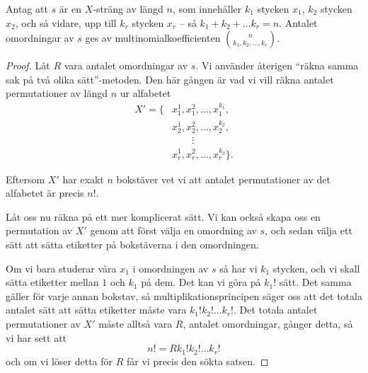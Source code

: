 \documentclass[nobib]{tufte-handout}
\begin{document}
\begin{proposition}
  Antag att $s$ är en $X$-sträng av längd $n$, som innehåller $k_1$ stycken $x_1$, $k_2$ stycken $x_2$, och så vidare, upp till $k_r$ stycken $x_r$ -- så $k_1 + k_2 + \ldots k_r = n$. Antalet omordningar av $s$ ges av multinomialkoefficienten $\binom{n}{k_1, k_2, \ldots, k_r}$.

  \begin{proof}
    Låt $R$ vara antalet omordningar av $s$. Vi använder återigen ``räkna samma sak på två olika sätt''-metoden. Den här gången är vad vi vill räkna antalet permutationer av längd $n$ ur alfabetet
    \begin{align*}
      X' = \{&x_1^1, x_1^2, \ldots, x_1^{k_1},\\
             &x_2^1, x_2^2, \ldots, x_2^{k_2},\\
             &\qquad\vdots\\
             &x_r^1, x_r^2, \ldots, x_r^{k_3}\}.
    \end{align*}

    Eftersom $X'$ har exakt $n$ bokstäver vet vi att antalet permutationer av det alfabetet är precis $n!$.

    Låt oss nu räkna på ett mer komplicerat sätt. Vi kan också skapa oss en permutation av $X'$ genom att först välja en omordning av $s$, och sedan välja ett sätt att sätta etiketter på bokstäverna i den omordningen.

    Om vi bara studerar våra $x_1$ i omordningen av $s$ så har vi $k_1$ stycken, och vi skall sätta etiketter mellan $1$ och $k_1$ på dem. Det kan vi göra på $k_1!$ sätt. Det samma gäller för varje annan bokstav, så multiplikationsprincipen säger oss att det totala antalet sätt att sätta etiketter måste vara $k_1!k_2!\ldots k_r!$. Det totala antalet permutationer av $X'$ måste alltså vara $R$, antalet omordningar, gånger detta, så vi har sett att 
    $$n! = Rk_1!k_2!\ldots k_r!$$
    och om vi löser detta för $R$ får vi precis den sökta satsen.
  \end{proof}
\end{proposition}
\end{document}
